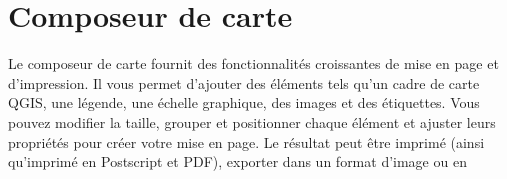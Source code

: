 \section{Composeur de carte}\label{label_printcomposer}


Le composeur de carte fournit des fonctionnalités croissantes de mise en page et
d'impression. Il vous permet d'ajouter des éléments tels qu'un cadre de carte
QGIS, une légende, une échelle graphique, des images et des étiquettes. Vous
pouvez modifier la taille, grouper et positionner chaque élément et ajuster
leurs propriétés pour créer votre mise en page. Le résultat peut être imprimé
(ainsi qu'imprimé en Postscript et PDF), exporter dans un format d'image ou en
